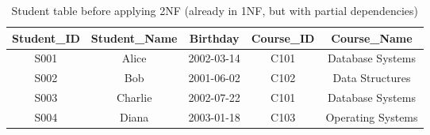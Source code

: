 \begin{table}[h!]
\centering
\caption{Student table before applying 2NF (already in 1NF, but with partial dependencies)}
\label{tab:order_before_2nf}
\begin{tabular}{|c|c|c|c|c|}
\hline
\textbf{Student\_ID} & \textbf{Student\_Name} & \textbf{Birthday} & \textbf{Course\_ID} & \textbf{Course\_Name} \\
\hline
S001 & Alice & 2002-03-14 & C101 & Database Systems \\
S002 & Bob & 2001-06-02 & C102 & Data Structures \\
S003 & Charlie & 2002-07-22 & C101 & Database Systems \\
S004 & Diana & 2003-01-18 & C103 & Operating Systems \\
\hline
\end{tabular}
\end{table}